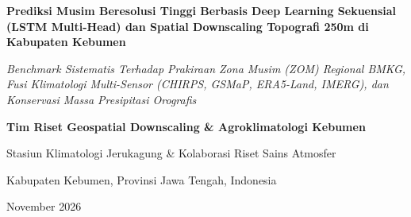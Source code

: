 \documentclass[11pt,a4paper]{article}
\begin{document}
\hypersetup{pageanchor=false}
\begin{titlepage}
    \centering
    \vspace*{1.5cm}
    
    {\Huge\bfseries Prediksi Musim Beresolusi Tinggi Berbasis Deep Learning Sekuensial (LSTM Multi-Head) dan Spatial Downscaling Topografi 250m di Kabupaten Kebumen\par}
    
    \vspace{1.0cm}
    {\Large\itshape Benchmark Sistematis Terhadap Prakiraan Zona Musim (ZOM) Regional BMKG, Fusi Klimatologi Multi-Sensor (CHIRPS, GSMaP, ERA5-Land, IMERG), dan Konservasi Massa Presipitasi Orografis\par}
    
    \vspace{2.0cm}
    {\large\bfseries Tim Riset Geospatial Downscaling \& Agroklimatologi Kebumen\par}
    \vspace{0.3cm}
    {\large Stasiun Klimatologi Jerukagung \& Kolaborasi Riset Sains Atmosfer\par}
    
    \vfill
    
    {\large Kabupaten Kebumen, Provinsi Jawa Tengah, Indonesia\par}
    \vspace{0.3cm}
    {\large November 2026\par}
\end{titlepage}

\hypersetup{pageanchor=true}
\setcounter{page}{1}
\end{document}

